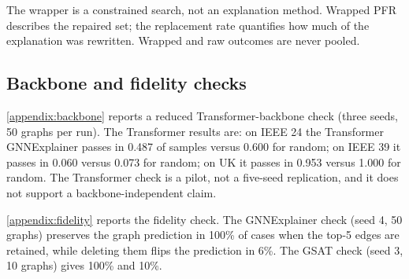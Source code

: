 \begin{table}[!htbp]
\centering
\caption{Finite-budget wrapper cost (SEP, five seeds for PFR and replacement rate; seed 2, first 20 samples, for the AC-call distribution, matching the runtime workload). ``Replace'' is the fraction of the five-edge set rewritten by the wrapper. ``AC calls'' counts every AC power-flow evaluation in the greedy and local-swap phases; it excludes the initial empty-set base audit and assumes the single swap round in Algorithm~\ref{alg:wrapper}. The corresponding worst-case bound is $N_{\mathrm{avail}}+kP$.}
\label{tab:wrapper}
\scriptsize
{}
\begin{flushleft}
\footnotesize
The wrapper is a constrained search, not an explanation method. Wrapped PFR describes the repaired set; the replacement rate quantifies how much of the explanation was rewritten. Wrapped and raw outcomes are never pooled.
\end{flushleft}
\end{table}



\subsection{Backbone and fidelity checks}\label{backbone_fidelity_results}

\ref{appendix:backbone} reports a reduced Transformer-backbone check (three seeds, 50 graphs per run). The Transformer results are: on IEEE 24 the Transformer GNNExplainer passes in 0.487 of samples versus 0.600 for random; on IEEE 39 it passes in 0.060 versus 0.073 for random; on UK it passes in 0.953 versus 1.000 for random. The Transformer check is a pilot, not a five-seed replication, and it does not support a backbone-independent claim.

\ref{appendix:fidelity} reports the fidelity check. The GNNExplainer check (seed 4, 50 graphs) preserves the graph prediction in 100\% of cases when the top-5 edges are retained, while deleting them flips the prediction in 6\%. The GSAT check (seed 3, 10 graphs) gives 100\% and 10\%. 

